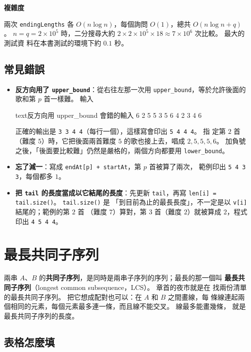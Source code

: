 \textbf{複雜度}

兩次 \texttt{endingLengths} 各 $O(n \log n)$，每個詢問 $O(1)$，總共
$O(n \log n + q)$。 $n = q = 2 \times 10^5$ 時，二分搜尋大約
$2 \times 2 \times 10^5 \times 18 \approx 7 \times 10^6$ 次比較。 最大的測試資
料在本書測試的環境下約 $0.1$ 秒。

\subsection{常見錯誤}

\begin{itemize}
\item \textbf{反方向用了 \texttt{upper\_bound}}：從右往左那一次用
\texttt{upper\_bound}，等於允許後面的歌和第 $p$ 首一樣難。 輸入
\begin{code}{text}{反方向用 upper\_bound 會錯的輸入}
6
2 5 5 3 5 6
4
2 3 4 6
\end{code}
正確的輸出是 \texttt{3 3 4 4}（每行一個），這樣寫會印出 \texttt{5 4 4 4}。 指
定第 $2$ 首（難度 $5$）時，它把後面兩首難度 $5$ 的歌也接上去，唱成
$2, 5, 5, 5, 6$。 加負號之後，「後面要比較難」仍然是嚴格的，兩個方向都要用
\texttt{lower\_bound}。
\item \textbf{忘了減一}：寫成 \texttt{endAt[p] + startAt}，第 $p$ 首被算了兩次，
範例印出 \texttt{5 4 3 3}，每個都多 $1$。
\item \textbf{把 \texttt{tail} 的長度當成以它結尾的長度}：先更新
\texttt{tail}，再寫 \texttt{len[i] = tail.size()}。 \texttt{tail.size()} 是
「到目前為止的最長長度」，不一定是以 \texttt{v[i]} 結尾的；範例的第 $2$ 首
（難度 $7$）算對，第 $3$ 首（難度 $2$）就被算成 $2$，程式印出
\texttt{4 5 4 4}。
\end{itemize}

\section{最長共同子序列}
\label{sec:ss-lcs}

兩串 $A$、$B$ 的\textbf{共同子序列}，是同時是兩串子序列的序列；最長的那一個叫
\textbf{最長共同子序列}（longest common subsequence，LCS）。 章首的夜市就是在
找兩份清單的最長共同子序列。 把它想成配對也可以：在 $A$ 和 $B$ 之間畫線，每
條線連起兩個相同的元素，每個元素最多連一條，而且線不能交叉。 線最多能畫幾條，
就是最長共同子序列的長度。

\subsection{表格怎麼填}
\label{sec:ss-lcs-table}

